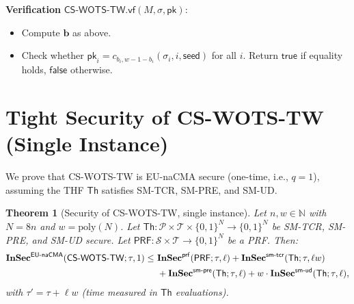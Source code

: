 \documentclass[11pt,a4paper]{article}
\newtheorem{theorem}{Theorem}[section]
\newcommand{\Th}{\mathsf{Th}}
\newcommand{\bits}{\{0,1\}}
\newcommand{\pk}{\mathsf{pk}}
\newcommand{\PK}{\mathsf{pk}}
\newcommand{\seed}{\mathsf{seed}}
\newcommand{\PRF}{\mathsf{PRF}}
\newcommand{\InSec}[1]{\mathbf{InSec}^{\mathsf{#1}}}
\newcommand{\poly}{\mathrm{poly}}
\newcommand{\Nbits}{N}
\begin{document}
\medskip\noindent\textbf{Verification} $\mathsf{CS\text{-}WOTS\text{-}TW.vf}(M, \sigma, \PK)$:
\begin{itemize}
    \item Compute $\mathbf{b}$ as above.
    \item Check whether $\pk_i = c_{b_i, w-1-b_i}(\sigma_i, i, \seed)$ for all $i$. Return $\mathsf{true}$ if equality holds, $\mathsf{false}$ otherwise.
\end{itemize}

\section{Tight Security of CS-WOTS-TW (Single Instance)}
\label{sec:wotstw-single}

We prove that CS-WOTS-TW is EU-naCMA secure (one-time, i.e., $q=1$), assuming the THF $\Th$ satisfies SM-TCR, SM-PRE, and SM-UD.

\begin{theorem}[Security of CS-WOTS-TW, single instance]
\label{thm:wots-tw}
Let $n,w \in \mathbb{N}$ with $\Nbits=8n$ and $w = \poly(\Nbits)$. Let $\Th : \mathcal{P} \times \mathcal{T} \times \bits^\Nbits \to \bits^\Nbits$ be SM-TCR, SM-PRE, and SM-UD secure. Let $\PRF : \mathcal{S} \times \mathcal{T} \to \bits^\Nbits$ be a PRF. Then:
%
\begin{align}
	\InSec{EU\text{-}naCMA}(\mathsf{CS\text{-}WOTS\text{-}TW}; \tau, 1) \le~& 
	\InSec{prf}(\PRF; \tau, \ell) + \InSec{sm\text{-}tcr}(\Th; \tau, \ell w)     \notag   \\
	&  + \InSec{sm\text{-}pre}(\Th; \tau, \ell)  + w \cdot \InSec{sm\text{-}ud}(\Th; \tau, \ell),
	\label{eq-bound-WOTS}
\end{align}
%
with $\tau' = \tau + \ell w$ (time measured in $\Th$ evaluations).
\end{theorem}
\end{document}
